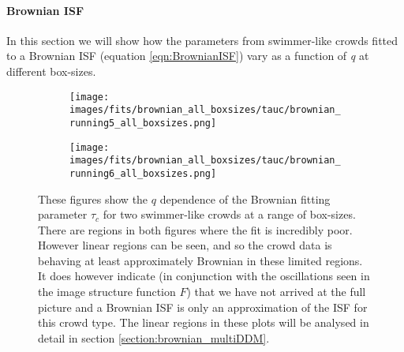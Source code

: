 \documentclass[10pt]{article}
\begin{document}
\paragraph{Brownian ISF} In this section we will show how the parameters from swimmer-like crowds fitted to a Brownian ISF (equation \ref{eqn:BrownianISF}) vary as a function of \textit{q} at different box-sizes. 
\begin{figure}[H]
\begin{subfigure}[t]{.5\textwidth}
  \centering
 \texttt{[image: images/fits/brownian\_all\_boxsizes/tauc/brownian\_running5\_all\_boxsizes.png]}
  \caption{}
\end{subfigure}%
\hfill
\begin{subfigure}[t]{.5\textwidth}
  \centering
  \texttt{[image: images/fits/brownian\_all\_boxsizes/tauc/brownian\_running6\_all\_boxsizes.png]}
  \caption{}
\end{subfigure}
\caption{These figures show the $q$ dependence of the Brownian fitting parameter $\tau_c$ for two swimmer-like crowds at a range of box-sizes. There are regions in both figures where the fit is incredibly poor. However linear regions can be seen, and so the crowd data is behaving at least approximately Brownian in these limited regions. It does however indicate (in conjunction with the oscillations seen in the image structure function $F$) that we have not arrived at the full picture and a Brownian ISF is only an approximation of the ISF for this crowd type. The linear regions in these plots will be analysed in detail in section \ref{section:brownian_multiDDM}.}
\label{fig:running_brownian_fits_tauc_all_boxsizes}
\end{figure}
\end{document}
